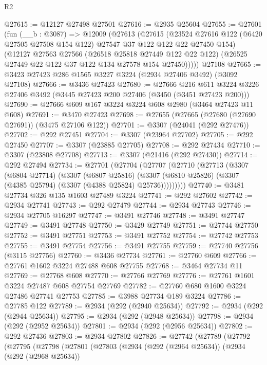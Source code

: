 \begin{lexlean}{R2}
\begin{coremodule}
@27615 := @12127 @27498 @27501
@27616 := @2935 @25604
@27655 := @27601
    (fun (__b : @3087) =>
    @12009
      (@27613
        (@27615
          (@23524 @27616 @122 (@6420 @27505 @27508 @154 @122) @27547 @37 @122 @122 @22 @27450 @154)
          (@12127
            @27563
            @27566
            (@26518 @25818 @27449 @122 @22 @122)
            (@26525 @27449 @22 @122 @37 @122 @134 @27578 @154 @27450)))))
    @27108
@27665 := @3423 @27423 @286 @1565 @3227 @3224 (@2934 @27406 @3492) (@3092 @27108)
@27666 := @3436 @27423
@27680 := @27666
    @216
    @611
    @3224
    @3226
    @27406
    @3492
    (@3445 @27423 @200 @27406 (@3450 (@3451 @27423 @200)))
@27690 := @27666 @609 @167 @3224 @3224 @608 @2980 (@3464 @27423 @11 @608)
@27691 := @3470 @27423
@27698 := @27655 (@27665 (@27680 (@27690 @27691)) (@3475 @27106 @122))
@27701 := @3307 (@24041 (@292 @27476))
@27702 := @292 @27451
@27704 := @3307 (@23964 @27702)
@27705 := @292 @27450
@27707 := @3307 (@23885 @27705)
@27708 := @292 @27434
@27710 := @3307 (@23808 @27708)
@27713 := @3307 (@21416 (@292 @27430))
@27714 := @292 @27494
@27734 := @27701
    (@27704
      (@27707
        (@27710
          (@27713
            (@3307
              (@6804 @27714)
              (@3307
                (@6807 @25816)
                (@3307 (@6810 @25826) (@3307 (@4385 @25794) (@3307 (@4388 @25824) @25736)))))))))
@27740 := @3481 @27734 @326 @135 @1603 @27489 @3224
@27741 := @292 @27602
@27742 := @2934 @27741
@27743 := @292 @27479
@27744 := @2934 @27743
@27746 := @2934 @27705 @16297
@27747 := @3491 @27746
@27748 := @3491 @27747
@27749 := @3491 @27748
@27750 := @3429 @27749
@27751 := @27744 @27750
@27752 := @3491 @27751
@27753 := @3491 @27752
@27754 := @27742 @27753
@27755 := @3491 @27754
@27756 := @3491 @27755
@27759 := @27740 @27756 (@3115 @27756)
@27760 := @3436 @27734
@27761 := @27760 @609
@27766 := @27761 @1602 @3224 @27488 @608 @27755
@27768 := @3464 @27734 @11
@27769 := @27768 @608
@27770 := @27766 @27769
@27776 := @27761 @1601 @3224 @27487 @608 @27754 @27769
@27782 := @27760 @680 @1600 @3224 @27486 @27741 @27753
@27785 := @3988 @27734 @189 @3224
@27786 := @27785 @122
@27789 := @2934 (@292 (@2940 @25634))
@27792 := @2934 (@292 (@2944 @25634))
@27795 := @2934 (@292 (@2948 @25634))
@27798 := @2934 (@292 (@2952 @25634))
@27801 := @2934 (@292 (@2956 @25634))
@27802 := @292 @27436
@27803 := @2934 @27802
@27826 := @27742
    (@27789
      (@27792
        (@27795
          (@27798
            (@27801
              (@27803
                (@2934
                  (@292 (@2964 @25634))
                  (@2934
                    (@292 (@2968 @25634))

\end{coremodule}
\end{lexlean}
